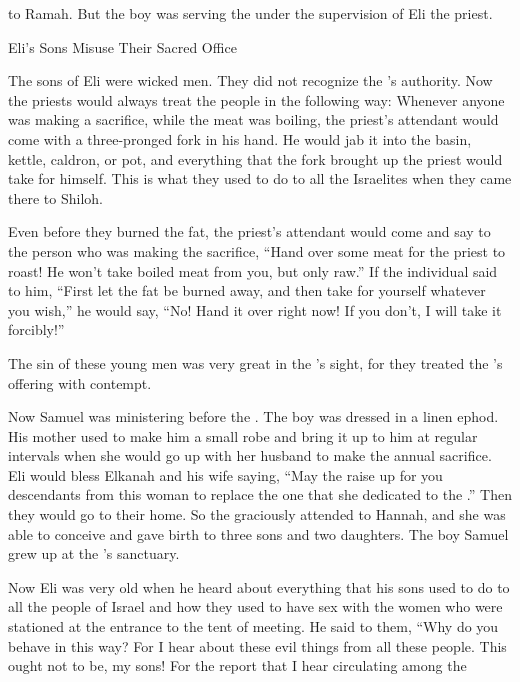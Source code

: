 {to Ramah.
But the boy
was
serving
the {}
under the supervision
of Eli
the priest.
\par }{\SH Eli’s Sons Misuse Their Sacred Office
\par }{\PP {}The sons
of Eli
were wicked
men. They did not
recognize
the
{}’s authority.
Now the priests
would always treat the people
in the following way: Whenever anyone
was making
a sacrifice,
while the meat
was boiling,
the priest’s
attendant
would come
with a three-pronged
fork
in his hand.
He would jab
it into the basin,
kettle,
caldron,
or
pot,
and everything
that
the fork
brought up
the priest
would take
for himself. This is what
they used to do
to all
the Israelites
when they came
there
to Shiloh.
\par }{\PP {}Even
before
they burned
the
fat,
the priest’s
attendant
would come
and say
to the person
who was making the sacrifice,
“Hand
over some meat
for the priest
to roast! He won’t
take
boiled
meat
from
you, but only
raw.”
If the individual
said
to him,
“First
let the fat
be burned away,
and then take
for yourself whatever
you
wish,”
he would say,
“No! Hand it over
right now! If
you don’t,
I will take
it forcibly!”
\par }{\PP {}The sin
of these young men
was very
great
in the
{}’s
sight,
for
they treated
the
{}’s
offering
with contempt.
\par }{\PP {}Now Samuel
was ministering
before
the {}. The boy
was dressed
in a linen
ephod.
His mother
used to make
him a small
robe
and bring it up
to him at
regular intervals when
she would go up
with
her husband
to make
the annual sacrifice.
Eli
would bless
Elkanah
and his wife
saying,
“May the
{}
raise up
for you descendants
from
this
woman
to replace
the one that she dedicated
to the
{}.” Then they would go
to their home.
So
the {}
graciously
attended
to Hannah,
and she was able to conceive
and gave birth
to three
sons
and two
daughters.
The boy
Samuel
grew
up at the
{}’s sanctuary.
\par }{\PP {}Now Eli
was very
old
when he heard
about everything
that
his sons
used to do to all
the people of Israel
and how they used to have
sex
with
the women
who were stationed
at the entrance
to the tent
of meeting.
He said
to them, “Why
do
you behave
in this way? For I
hear
about
these
evil
things
from all
these
people.
This ought not
to be, my sons! For
the report
that
I
hear
circulating
among the
}
